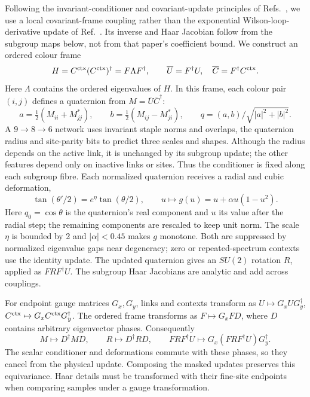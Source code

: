 \documentclass[aps,prd,superscriptaddress,nofootinbib,eqsecnum,floatfix,amsmath,longbibliography]{revtex4-2}
\begin{document}
Following the invariant-conditioner and covariant-update principles of
Refs.~\cite{he,jin}, we use a local covariant-frame coupling rather than
the exponential Wilson-loop-derivative update of Ref.~\cite{jin}.
Its inverse and Haar Jacobian follow from the subgroup maps below,
not from that paper's coefficient bound. We construct an ordered colour frame
\begin{equation}
 H=C^{\rm ctx}(C^{\rm ctx})^\dagger=F\Lambda F^\dagger,\qquad
 \overline U=F^\dagger U,\quad
 \overline C=F^\dagger C^{\rm ctx}.
\end{equation}
Here $\Lambda$ contains the ordered eigenvalues of $H$.
In this frame, each colour pair $(i,j)$ defines a quaternion from
$M=\overline U\overline C^\dagger$:
\begin{equation}
 a=\tfrac12(M_{ii}+M_{jj}^*),\qquad
 b=\tfrac12(M_{ij}-M_{ji}^*),\qquad
 q=(a,b)/\sqrt{|a|^2+|b|^2}.
\end{equation}
A $9\to8\to6$ network uses invariant staple norms and overlaps, the
quaternion radius and site-parity bits to predict three scales and shapes.
Although the radius depends on the active link, it is unchanged by its
subgroup update; the other features depend only on inactive links or sites.
Thus the conditioner is fixed along each subgroup fibre.
Each normalized quaternion receives a radial and cubic deformation,
\begin{equation}
 \tan(\theta'/2)=e^{\eta}\tan(\theta/2),\qquad
 u\mapsto g(u)=u+\alpha u(1-u^2).
\end{equation}
Here $q_0=\cos\theta$ is the quaternion's real component and $u$ its value
after the radial step; the remaining components are rescaled to keep unit
norm. The scale $\eta$ is bounded by 2 and $|\alpha|<0.45$ makes $g$
monotone. Both are suppressed by normalized eigenvalue gaps near degeneracy;
zero or repeated-spectrum contexts use the identity update. The updated
quaternion gives an $SU(2)$ rotation $R$, applied as $FRF^\dagger U$.
The subgroup Haar Jacobians are analytic and add across couplings.

For endpoint gauge matrices $G_x,G_y$, links and contexts transform as
$U\mapsto G_xUG_y^\dagger$, $C^{\rm ctx}\mapsto G_xC^{\rm ctx}G_y^\dagger$.
The ordered frame transforms as $F\mapsto G_xFD$, where $D$ contains
arbitrary eigenvector phases. Consequently
\begin{equation}
 M\mapsto D^\dagger MD,\qquad R\mapsto D^\dagger RD,\qquad
 FRF^\dagger U\mapsto G_x(FRF^\dagger U)G_y^\dagger.
\end{equation}
The scalar conditioner and deformations commute with these phases, so they
cancel from the physical update. Composing the masked updates preserves
this equivariance. Haar details must be transformed with their fine-site
endpoints when comparing samples under a gauge transformation.
\end{document}
